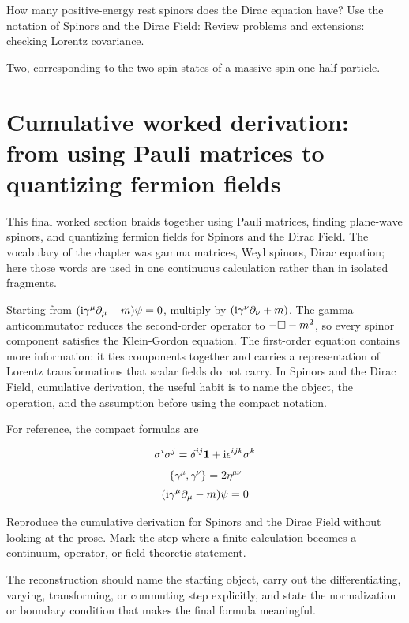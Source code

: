 \begin{exercise}
How many positive-energy rest spinors does the Dirac equation have?  Use the notation of Spinors and the Dirac Field: Review problems and extensions: checking Lorentz covariance.
\begin{answer}
Two, corresponding to the two spin states of a massive spin-one-half particle.
\end{answer}
\end{exercise}



\section{Cumulative worked derivation: from using Pauli matrices to quantizing fermion fields}

This final worked section braids together using Pauli matrices, finding plane-wave spinors, and quantizing fermion fields for Spinors and the Dirac Field.  The vocabulary of the chapter was gamma matrices, Weyl spinors, Dirac equation; here those words are used in one continuous calculation rather than in isolated fragments.

Starting from \((\mathrm i\gamma^\mu\partial_\mu-m)\psi=0\), multiply by \((\mathrm i\gamma^\nu\partial_\nu+m)\).  The gamma anticommutator reduces the second-order operator to \(-\Box-m^2\), so every spinor component satisfies the Klein-Gordon equation.  The first-order equation contains more information: it ties components together and carries a representation of Lorentz transformations that scalar fields do not carry.  In Spinors and the Dirac Field, cumulative derivation, the useful habit is to name the object, the operation, and the assumption before using the compact notation.

For reference, the compact formulas are

\[
  \sigma^i\sigma^j=\delta^{ij}\mathbf 1+\mathrm i\epsilon^{ijk}\sigma^k
\]
\[
  \{\gamma^\mu,\gamma^\nu\}=2\eta^{\mu\nu}
\]
\[
  (\mathrm i\gamma^\mu\partial_\mu-m)\psi=0
\]

\begin{exercise}
Reproduce the cumulative derivation for Spinors and the Dirac Field without looking at the prose.  Mark the step where a finite calculation becomes a continuum, operator, or field-theoretic statement.
\begin{answer}
The reconstruction should name the starting object, carry out the differentiating, varying, transforming, or commuting step explicitly, and state the normalization or boundary condition that makes the final formula meaningful.
\end{answer}
\end{exercise}




